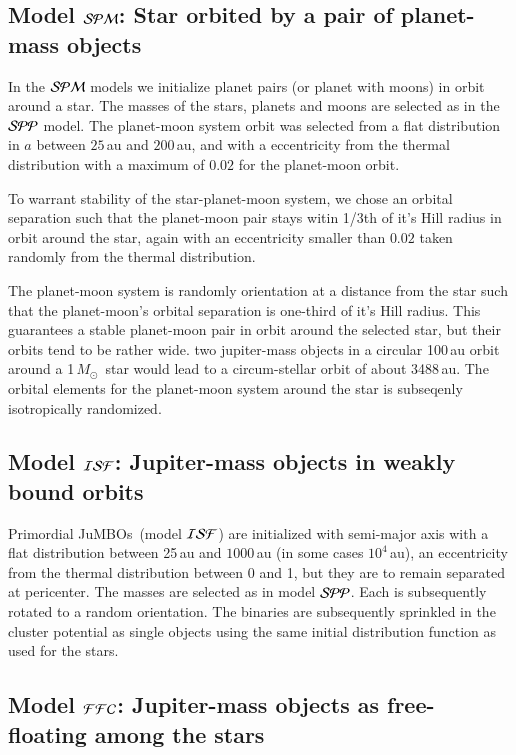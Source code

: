 \documentclass[submission,phys]{lib/SciPost}
\newcommand{\MSun}{\mbox{${M}_\odot$}}
\newcommand{\jumbos}{\mbox{JuMBOs}}
\begin{document}
\subsection{Model ${\cal SPM}$: Star orbited by a pair of planet-mass objects}

In the ${\cal SPM}$ models we initialize planet pairs (or planet with
moons) in orbit around a star. The masses of the stars, planets and
moons are selected as in the ${\cal SPP}$ model.  The planet-moon
system orbit was selected from a flat distribution in $a$ between
$25$\,au and $200$\,au, and with a eccentricity from the thermal
distribution with a maximum of $0.02$ for the planet-moon orbit.

To warrant stability of the star-planet-moon system, we chose an
orbital separation such that the planet-moon pair stays witin 1/3th of
it's Hill radius in orbit around the star, again with an eccentricity
smaller than $0.02$ taken randomly from the thermal distribution.

The planet-moon system is randomly orientation at a distance from the
star such that the planet-moon's orbital separation is one-third of
it's Hill radius.  This guarantees a stable planet-moon pair in orbit
around the selected star, but their orbits tend to be rather wide.
two jupiter-mass objects in a circular 100\,au orbit around a
1\,\MSun\, star would lead to a circum-stellar orbit of about
3488\,au. The orbital elements for the planet-moon system around the
star is subseqenly isotropically randomized.

\subsection{Model ${\cal ISF}$: Jupiter-mass objects in weakly bound orbits}

Primordial \jumbos\, (model ${\cal ISF}$) are initialized with
semi-major axis with a flat distribution between 25\,au and $1000$\,au
(in some cases $10^4$\,au), an eccentricity from the thermal
distribution between 0 and 1, but they are to remain separated at
pericenter.  The masses are selected as in model ${\cal SPP}$.  Each
is subsequently rotated to a random orientation.  The binaries are
subsequently sprinkled in the cluster potential as single objects
using the same initial distribution function as used for the stars.

\subsection{Model ${\cal FFC}$: Jupiter-mass objects as free-floating among the stars}
\end{document}
